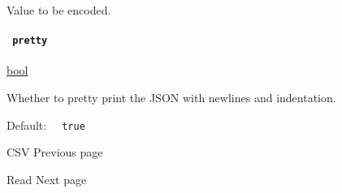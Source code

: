 Value to be encoded.

\paragraph{\texorpdfstring{\texttt{\ pretty\ }}{ pretty }}\label{definitions-encode-pretty}

\href{/docs/reference/foundations/bool/}{bool}

Whether to pretty print the JSON with newlines and indentation.

Default: \texttt{\ }{\texttt{\ true\ }}\texttt{\ }

\href{/docs/reference/data-loading/csv/}{\pandocbounded{}}

{ CSV } { Previous page }

\href{/docs/reference/data-loading/read/}{\pandocbounded{}}

{ Read } { Next page }
